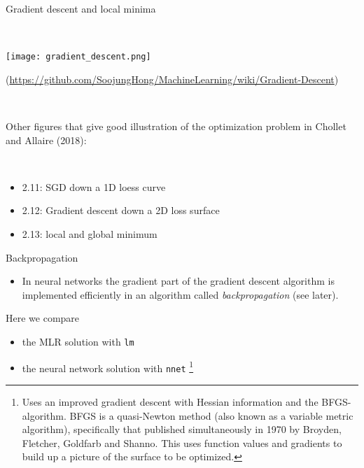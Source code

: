 \documentclass[10pt,ignorenonframetext,]{beamer}
\providecommand{\tightlist}{%
  \setlength{\itemsep}{0pt}\setlength{\parskip}{0pt}}
\begin{document}
\begin{frame}

\begin{block}{Gradient descent and local minima}

\(~\)

\center

\texttt{[image: gradient\_descent.png]}

\tiny (\url{https://github.com/SoojungHong/MachineLearning/wiki/Gradient-Descent})

\(~\) \(~\)

\flushleft
\normalsize

Other figures that give good illustration of the optimization problem in
Chollet and Allaire (2018):

\(~\)

\begin{itemize}
\tightlist
\item
  2.11: SGD down a 1D loess curve
\item
  2.12: Gradient descent down a 2D loss surface
\item
  2.13: local and global minimum
\end{itemize}

\end{block}

\end{frame}

\begin{frame}[fragile]

\begin{block}{Backpropagation}

\vspace{2mm}

\begin{itemize}
\tightlist
\item
  In neural networks the gradient part of the gradient descent algorithm
  is implemented efficiently in an algorithm called
  \emph{backpropagation} (see later).
\end{itemize}

\vspace{4mm}

Here we compare

\begin{itemize}
\tightlist
\item
  the MLR solution with \texttt{lm}
\item
  the neural network solution with \texttt{nnet}
  \footnote{Uses an improved gradient descent with Hessian information and the BFGS-algorithm. BFGS is a quasi-Newton method (also known as a variable metric algorithm), specifically that published simultaneously in 1970 by Broyden, Fletcher, Goldfarb and Shanno. This uses function values and gradients to build up a picture of the surface to be optimized.}
\end{itemize}

\end{block}

\end{frame}
\end{document}
